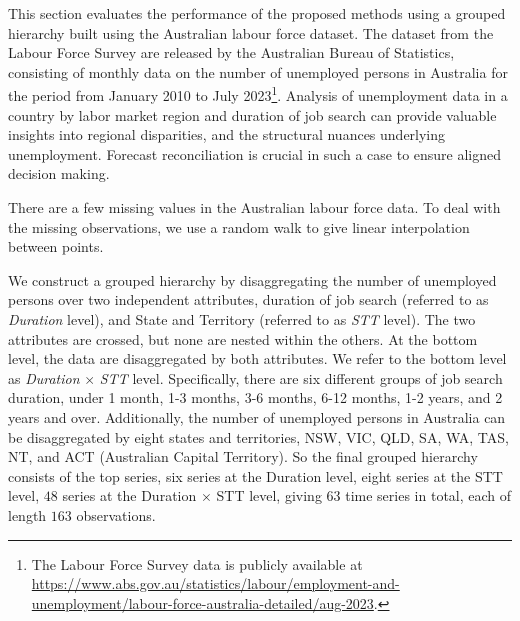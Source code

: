\documentclass[11pt,a4paper,]{article}
\begin{document}
This section evaluates the performance of the proposed methods using a
grouped hierarchy built using the Australian labour force dataset. The
dataset from the Labour Force Survey are released by the Australian
Bureau of Statistics, consisting of monthly data on the number of
unemployed persons in Australia for the period from January 2010 to July
2023\footnote{The Labour Force Survey data is publicly available at
  \url{https://www.abs.gov.au/statistics/labour/employment-and-unemployment/labour-force-australia-detailed/aug-2023}.}.
Analysis of unemployment data in a country by labor market region and
duration of job search can provide valuable insights into regional
disparities, and the structural nuances underlying unemployment.
Forecast reconciliation is crucial in such a case to ensure aligned
decision making.

There are a few missing values in the Australian labour force data. To
deal with the missing observations, we use a random walk to give linear
interpolation between points.

We construct a grouped hierarchy by disaggregating the number of
unemployed persons over two independent attributes, duration of job
search (referred to as \emph{Duration} level), and State and Territory
(referred to as \emph{STT} level). The two attributes are crossed, but
none are nested within the others. At the bottom level, the data are
disaggregated by both attributes. We refer to the bottom level as
\emph{Duration} \(\times\) \emph{STT} level. Specifically, there are six
different groups of job search duration, under 1 month, 1-3 months, 3-6
months, 6-12 months, 1-2 years, and 2 years and over. Additionally, the
number of unemployed persons in Australia can be disaggregated by eight
states and territories, NSW, VIC, QLD, SA, WA, TAS, NT, and ACT
(Australian Capital Territory). So the final grouped hierarchy consists
of the top series, six series at the Duration level, eight series at the
STT level, \(48\) series at the Duration \(\times\) STT level, giving
\(63\) time series in total, each of length \(163\) observations.
\end{document}
